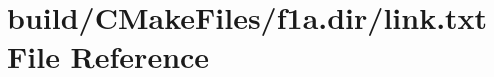 \hypertarget{f1a_8dir_2link_8txt}{}\section{build/\+C\+Make\+Files/f1a.dir/link.txt File Reference}
\label{f1a_8dir_2link_8txt}
